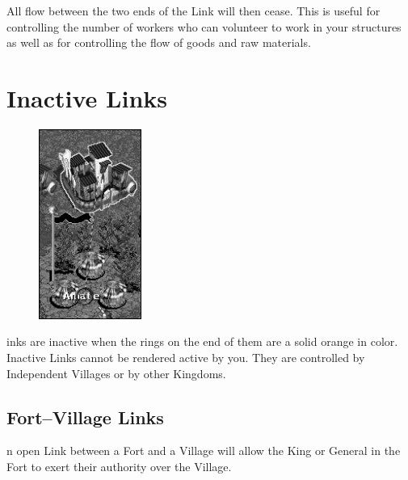 All flow between the two ends of the Link will then cease. This is useful for controlling the number of workers who can volunteer to work in your structures as well as for controlling the flow of goods and raw materials.

\clearpage

\section{Inactive Links}


\begin{figure}
	\vspace{-20pt}
	\begin{center}
		\includegraphics[width=0.3\textwidth]{Iinactivelink}
	\end{center}
	\vspace{-50pt}
\end{figure}

inks are inactive when the rings on the end of them are a solid orange in color. Inactive Links cannot be rendered active by you. They are controlled by Independent Villages or by other Kingdoms. 

\subsection{Fort–Village Links}


n open Link between a Fort and a Village will allow the King or General in the Fort to exert their authority over the Village.

